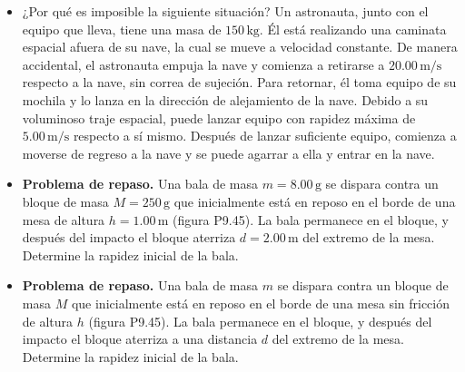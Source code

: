 \documentclass[11pt,a4paper]{article}
\begin{document}
\begin{itemize}
    \item[\textbf{44.}] ¿Por qué es imposible la siguiente situación? Un astronauta, junto con el equipo que lleva, tiene una masa de \(150\,\text{kg}\). Él está realizando una caminata espacial afuera de su nave, la cual se mueve a velocidad constante. De manera accidental, el astronauta empuja la nave y comienza a retirarse a \(20.00\,\text{m/s}\) respecto a la nave, sin correa de sujeción. Para retornar, él toma equipo de su mochila y lo lanza en la dirección de alejamiento de la nave. Debido a su voluminoso traje espacial, puede lanzar equipo con rapidez máxima de \(5.00\,\text{m/s}\) respecto a sí mismo. Después de lanzar suficiente equipo, comienza a moverse de regreso a la nave y se puede agarrar a ella y entrar en la nave.
    \vspace*{6cm}

    \item[\textbf{45.}] \textbf{Problema de repaso.} Una bala de masa \(m = 8.00\,\text{g}\) se dispara contra un bloque de masa \(M = 250\,\text{g}\) que inicialmente está en reposo en el borde de una mesa de altura \(h = 1.00\,\text{m}\) (figura P9.45). La bala permanece en el bloque, y después del impacto el bloque aterriza \(d = 2.00\,\text{m}\) del extremo de la mesa. Determine la rapidez inicial de la bala.
    \vspace*{6cm}

    \item[\textbf{46.}] \textbf{Problema de repaso.} Una bala de masa \(m\) se dispara contra un bloque de masa \(M\) que inicialmente está en reposo en el borde de una mesa sin fricción de altura \(h\) (figura P9.45). La bala permanece en el bloque, y después del impacto el bloque aterriza a una distancia \(d\) del extremo de la mesa. Determine la rapidez inicial de la bala.
    \vspace*{6cm}
\end{itemize}

\newpage
\end{document}
